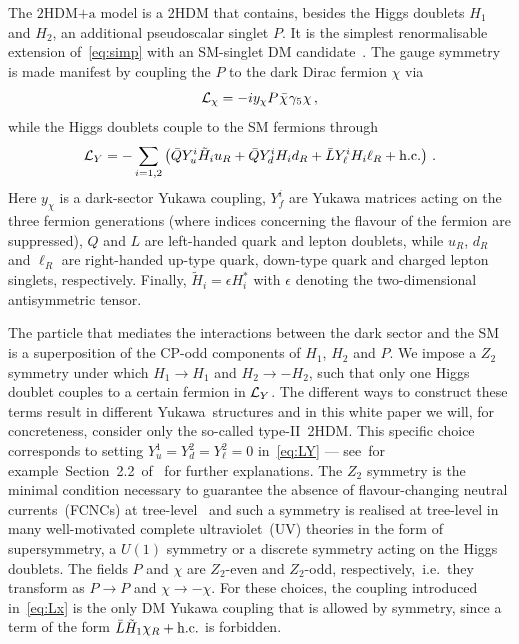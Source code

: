 \documentclass[a4paper, 11pt,notoc]{article}
\newcommand{\hdma}{\ensuremath{\textrm{2HDM+a}}\xspace}
\begin{document}
The \hdma model is a 2HDM that contains, besides the Higgs doublets $H_1$ and $H_2$, an additional pseudoscalar singlet $P$. It is the simplest renormalisable extension of~\eqref{eq:simp} with an SM-singlet DM candidate~\cite{Ipek:2014gua,No:2015xqa,Goncalves:2016iyg,Bauer:2017ota,Tunney:2017yfp}. The gauge symmetry is made manifest by coupling the $P$ to the dark Dirac fermion  $\chi$ via
\begin{equation} \label{eq:Lx}
{\cal L}_\chi = - i y_\chi P \hspace{0.25mm} \bar \chi \hspace{0.25mm} \gamma_5 \hspace{0.1mm} \chi \,,
\end{equation}
while the Higgs doublets couple to the SM fermions through
\begin{equation} \label{eq:LY}
{\cal L}_{Y} = - \sum_{i=1,2} \left ( \bar Q Y_u^i \tilde H_i u_R  + \bar Q Y_d^i H_i d_R   + \bar L Y_\ell^i H_i \ell_R  + {\rm h.c.}  \right ) \,.
\end{equation}
Here $y_\chi$ is a dark-sector Yukawa coupling, $Y_f^i$ are Yukawa matrices acting on the three fermion generations (where indices concerning the flavour of the fermion are suppressed), $Q$ and $L$ are left-handed quark and lepton doublets, while $u_R$, $d_R$ and $\ell_R$ are right-handed up-type quark, down-type quark and charged lepton singlets, respectively. Finally, $\tilde H_i = \epsilon H_i^\ast$ with $\epsilon$ denoting the  two-dimensional antisymmetric tensor.

The particle that mediates the interactions between the dark sector and the SM is a superposition of the CP-odd components of $H_1$, $H_2$ and $P$. We impose a $Z_2$ symmetry under which $H_1\to H_1$ and $H_2\to -H_2$, such that only one Higgs doublet couples to a certain fermion in ${\cal L}_{Y}$. The different ways to construct these terms result in different Yukawa~structures and in this white paper we will, for concreteness, consider only the so-called type-II~2HDM. This specific choice corresponds to setting $Y_u^1  = Y_d^2 = Y_\ell^2 =0$ in~\eqref{eq:LY} --- see~for example~Section~2.2~of~\cite{Bauer:2017ota} for further explanations.  The $Z_2$ symmetry is the minimal condition necessary to guarantee the absence of flavour-changing neutral currents~(FCNCs) at tree-level~\cite{Glashow:1976nt,Paschos:1976ay} and such a symmetry is realised at tree-level in many well-motivated complete ultraviolet~(UV) theories in the form of supersymmetry, a $U(1)$ symmetry or  a discrete symmetry acting on the Higgs doublets. The fields $P$ and $\chi$ are $Z_2$-even and $Z_2$-odd, respectively,~i.e.~they transform as $P \to P$ and $\chi \to -\chi$. For these choices, the coupling introduced in~\eqref{eq:Lx} is the only DM Yukawa coupling that is allowed by symmetry, since  a term of the form $\bar L  \tilde H_1 \chi_R + {\rm h.c.}$ is forbidden. 
\end{document}
